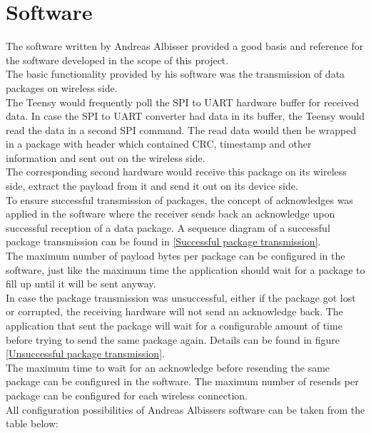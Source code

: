 \section{Software}
The software written by Andreas Albisser provided a good basis and reference for the software developed in the scope of this project.\\
%
The basic functionality provided by his software was the transmission of data packages on wireless side.\\
The Teensy would frequently poll the SPI to UART hardware buffer for received data. In case the SPI to UART converter had data in its buffer, the Teensy would read the data in a second SPI command. The read data would then be wrapped in a package with header which contained CRC, timestamp and other information and sent out on the wireless side.\\
The corresponding second hardware would receive this package on its wireless side, extract the payload from it and send it out on its device side. \\
To ensure successful transmission of packages, the concept of acknowledges was applied in the software where the receiver sends back an acknowledge upon successful reception of a data package. A sequence diagram of a successful package transmission can be found in \autoref{Successful package transmission}.\\
The maximum number of payload bytes per package can be configured in the software, just like the maximum time the application should wait for a package to fill up until it will be sent anyway.\\
%
In case the package transmission was unsuccessful, either if the package got lost or corrupted, the receiving hardware will not send an acknowledge back. The application that sent the package will wait for a configurable amount of time before trying to send the same package again. Details can be found in figure \autoref{Unsuccessful package transmission}.\\
The maximum time to wait for an acknowledge before resending the same package can be configured in the software. The maximum number of resends per package can be configured for each wireless connection. \\
All configuration possibilities of Andreas Albissers software can be taken from the table below:
